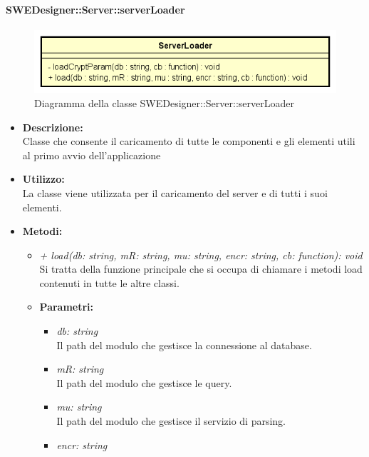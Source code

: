       \paragraph{SWEDesigner::Server::serverLoader}
      	\begin{figure}[h!]
		\centering
		\includegraphics[scale=0.8]{Classi/ServerLoader.png}
		\caption{Diagramma della classe SWEDesigner::Server::serverLoader}
 		\end{figure}
        \begin{itemize}
          \item \textbf{Descrizione:}\\
          Classe che consente il caricamento di tutte le componenti e gli elementi utili al primo avvio dell'applicazione
          \item \textbf{Utilizzo:}\\
          La classe viene utilizzata per il caricamento del server e di tutti i suoi elementi.
          \item \textbf{Metodi:}\\
          \begin{itemize}
            \item \emph{+ load(db: string, mR: string, mu: string, encr: string, cb: function): void}\\
            Si tratta della funzione principale che si occupa di chiamare i metodi load contenuti in tutte le altre classi.
            \item \textbf{Parametri:}\\
            \begin{itemize}
              \item \emph{db: string}\\
              Il path del modulo che gestisce la connessione al database.
              \item \emph{mR: string}\\
              Il path del modulo che gestisce le query.
              \item \emph{mu: string}\\
              Il path del modulo che gestisce il servizio di parsing.
              \item \emph{encr: string}\\

\end{itemize}
\end{itemize}
\end{itemize}
